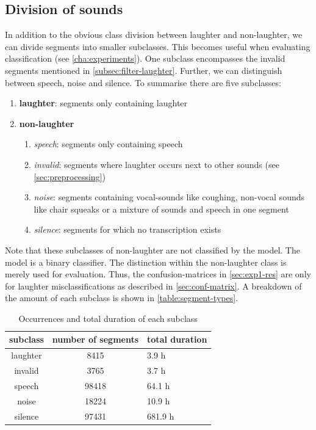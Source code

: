 \documentclass[bsc,frontabs,parskip,deptreport]{infthesis}
\begin{document}
\subsection{Division of sounds}
In addition to the obvious class division between laughter and non-laughter, we can divide segments into smaller subclasses. This becomes useful when evaluating classification (see \autoref{cha:experiments}).
One subclass encompasses the invalid segments mentioned in \autoref{subsec:filter-laughter}. 
Further, we can distinguish between speech, noise and silence.
To summarise there are five subclasses:
\begin{enumerate}
    \item \textbf{laughter}: segments only containing laughter
    \item \textbf{non-laughter}
    \begin{enumerate}
        \item \textit{speech}: segments only containing speech
        \item \textit{invalid}: segments where laughter occurs next to other sounds (see \autoref{sec:preprocessing})
        \item \textit{noise}: segments containing vocal-sounds like coughing, non-vocal sounds like chair squeaks or a mixture of sounds and speech in one segment
        \item \textit{silence}: segments for which no transcription exists
    \end{enumerate}
\end{enumerate}
Note that these subclasses of non-laughter are not classified by the model. The model is a binary classifier. The distinction within the non-laughter class is merely used for evaluation.
Thus, the confusion-matrices in \autoref{sec:exp1-res} are only for laughter misclassifications as described in \autoref{sec:conf-matrix}.
A breakdown of the amount of each subclass is shown in \autoref{table:segment-types}.

\begin{table}[h!]
\begin{tabular}{c|c|l}
     subclass & number of segments & total duration \\
     \hline
     laughter & 8415 & 3.9 h \\ 
     invalid & 3765 & 3.7 h \\
     speech & 98418 & 64.1 h \\
     noise & 18224 & 10.9 h \\
     silence & 97431 & 681.9 h 
\end{tabular}
\centering
\caption{Occurrences and total duration of each subclass}
\label{table:segment-types}
\end{table}
\end{document}
